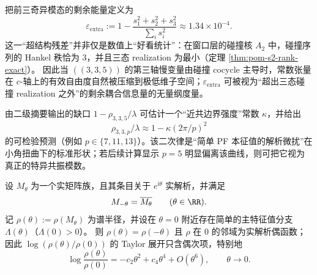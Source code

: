 \begin{remark}\label{rem:arity-335-low-rank-vs-hankel}
把前三奇异模态的剩余能量定义为
\[
\varepsilon_{\mathrm{extra}}
:=1-\frac{s_1^2+s_2^2+s_3^2}{\sum_i s_i^2}\approx 1.34\times 10^{-4}.
\]
这一“超结构残差”并非仅是数值上“好看统计”：在窗口层的碰撞核 \(A_2\) 中，碰撞序列的 Hankel 秩恰为 \(3\)，并且三态 realization 为最小（定理 \ref{thm:pom-s2-rank-exact}）。
因此当 \(((3,3,5))\) 的第三轴慢变量由碰撞 cocycle 主导时，常数张量在 \(c\)-轴上的有效自由度自然被压缩到极低维子空间；\(\varepsilon_{\mathrm{extra}}\) 可被视为“超出三态碰撞 realization 之外”的剩余耦合信息量的无量纲度量。
\end{remark}

\begin{remark}\label{rem:arity-335-near-coboundary-scaling}
由二级摘要输出的缺口 $1-\rho_{3,3,5}/\lambda$ 可估计一个“近共边界强度”常数 $\kappa$，并给出
\[
\rho_{3,3,p}/\lambda\approx 1-\kappa(2\pi/p)^2
\]
的可检验预测（例如 $p\in\{7,11,13\}$）。该二次律是“简单 PF 本征值的解析微扰”在小角扭曲下的标准形状；若后续计算显示 $p=5$ 明显偏离该曲线，则可把它视为真正的特异共振模数。
\end{remark}

\begin{remark}[单位圆扭曲的偶性与无三次项]\label{lem:unit-circle-evenness}
设 $M_\theta$ 为一个实矩阵族，且其条目关于 $e^{\mathrm{i}\theta}$ 实解析，并满足
\[
M_{-\theta}=\overline{M_\theta}\qquad(\theta\in\RR).
\]
记 $\rho(\theta):=\rho(M_\theta)$ 为谱半径，并设在 $\theta=0$ 附近存在简单的主特征值分支 $\Lambda(\theta)$（$\Lambda(0)>0$）。
则 \(\rho(\theta)=\rho(-\theta)\) 且 \(\rho\) 在 \(0\) 的邻域为实解析偶函数；因此 \(\log(\rho(\theta)/\rho(0))\) 的 Taylor 展开只含偶次项，特别地
\[
\log\frac{\rho(\theta)}{\rho(0)}=-c_2\theta^2+c_4\theta^4+O(\theta^6),
\qquad \theta\to 0.
\]
\end{remark}

